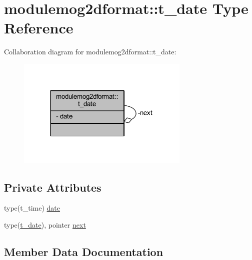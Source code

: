 \hypertarget{structmodulemog2dformat_1_1t__date}{}\section{modulemog2dformat\+:\+:t\+\_\+date Type Reference}
\label{structmodulemog2dformat_1_1t__date}


Collaboration diagram for modulemog2dformat\+:\+:t\+\_\+date\+:\nopagebreak
\begin{figure}[H]
\begin{center}
\leavevmode
\includegraphics[width=233pt]{structmodulemog2dformat_1_1t__date__coll__graph}
\end{center}
\end{figure}
\subsection*{Private Attributes}
\begin{DoxyCompactItemize}
\item 
type(t\+\_\+time) \mbox{\hyperlink{structmodulemog2dformat_1_1t__date_a0997b9fda022cd8d32e83cf6a8a7ac9e}{date}}
\item 
type(\mbox{\hyperlink{structmodulemog2dformat_1_1t__date}{t\+\_\+date}}), pointer \mbox{\hyperlink{structmodulemog2dformat_1_1t__date_ab44d246d6b50d32432bd0350eefe65f9}{next}}
\end{DoxyCompactItemize}


\subsection{Member Data Documentation}
\mbox{\label{structmodulemog2dformat_1_1t__date_a0997b9fda022cd8d32e83cf6a8a7ac9e}} 
